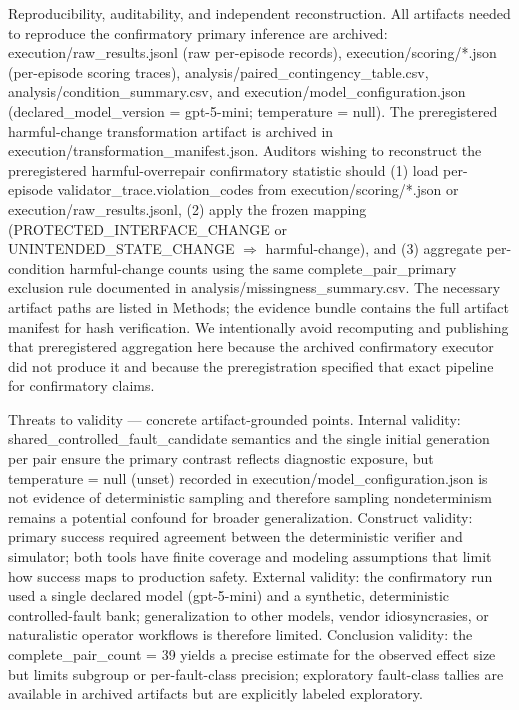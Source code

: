 \documentclass[conference]{IEEEtran}
\begin{document}
Reproducibility, auditability, and independent reconstruction. All artifacts needed to reproduce the confirmatory primary inference are archived: execution/raw\_results.jsonl (raw per-episode records), execution/scoring/*.json (per-episode scoring traces), analysis/paired\_contingency\_table.csv, analysis/condition\_summary.csv, and execution/model\_configuration.json (declared\_model\_version = gpt-5-mini; temperature = null). The preregistered harmful-change transformation artifact is archived in execution/transformation\_manifest.json. Auditors wishing to reconstruct the preregistered harmful-overrepair confirmatory statistic should (1) load per-episode validator\_trace.violation\_codes from execution/scoring/*.json or execution/raw\_results.jsonl, (2) apply the frozen mapping (PROTECTED\_INTERFACE\_CHANGE or UNINTENDED\_STATE\_CHANGE \ensuremath{\Rightarrow} harmful-change), and (3) aggregate per-condition harmful-change counts using the same complete\_pair\_primary exclusion rule documented in analysis/missingness\_summary.csv. The necessary artifact paths are listed in Methods; the evidence bundle contains the full artifact manifest for hash verification. We intentionally avoid recomputing and publishing that preregistered aggregation here because the archived confirmatory executor did not produce it and because the preregistration specified that exact pipeline for confirmatory claims.

Threats to validity --- concrete artifact-grounded points. Internal validity: shared\_controlled\_fault\_candidate semantics and the single initial generation per pair ensure the primary contrast reflects diagnostic exposure, but temperature = null (unset) recorded in execution/model\_configuration.json is not evidence of deterministic sampling and therefore sampling nondeterminism remains a potential confound for broader generalization. Construct validity: primary success required agreement between the deterministic verifier and simulator; both tools have finite coverage and modeling assumptions that limit how success maps to production safety. External validity: the confirmatory run used a single declared model (gpt-5-mini) and a synthetic, deterministic controlled-fault bank; generalization to other models, vendor idiosyncrasies, or naturalistic operator workflows is therefore limited. Conclusion validity: the complete\_pair\_count = 39 yields a precise estimate for the observed effect size but limits subgroup or per-fault-class precision; exploratory fault-class tallies are available in archived artifacts but are explicitly labeled exploratory.
\end{document}
